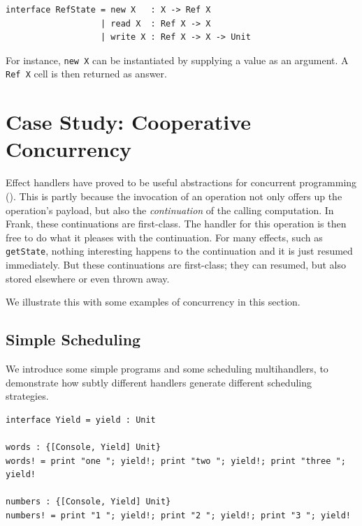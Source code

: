 \documentclass[msc,deptreport,cs]{infthesis} %
\newcommand{\code}[1]{\lstinline{#1}}
\newcommand{\todo}[1]
           {{\par\noindent\small\color{RoyalPurple}
  \framebox{\parbox{\dimexpr\linewidth-2\fboxsep-2\fboxrule}
    {\textbf{TODO:} #1}}}}
\begin{document}
\begin{lstlisting}
interface RefState = new X   : X -> Ref X
                   | read X  : Ref X -> X
                   | write X : Ref X -> X -> Unit
\end{lstlisting}

\noindent For instance, \code{new X} can be instantiated by supplying a value as
an argument. A \code{Ref X} cell is then returned as answer.

\section{Case Study: Cooperative Concurrency}
\label{sec:concurrency}


Effect handlers have proved to be useful abstractions for concurrent programming
(\cite{dolan2015effective, dolan2017concurrent, hillerstrom2016compilation}).
This is partly because the invocation of an operation not only offers up the
operation's payload, but also the \emph{continuation} of the calling
computation. In Frank, these continuations are first-class. The handler for this
operation is then free to do what it pleases with the continuation. For many
effects, such as \code{getState}, nothing interesting happens to the
continuation and it is just resumed immediately. But these continuations are
first-class; they can resumed, but also stored elsewhere or even thrown away.

We illustrate this with some examples of concurrency in this section.

%

\subsection{Simple Scheduling}
\label{subsec:simple-scheduling}

We introduce some simple programs and some scheduling multihandlers, to
demonstrate how subtly different handlers generate different scheduling
strategies.

\begin{lstlisting}
interface Yield = yield : Unit

words : {[Console, Yield] Unit}
words! = print "one "; yield!; print "two "; yield!; print "three "; yield!

numbers : {[Console, Yield] Unit}
numbers! = print "1 "; yield!; print "2 "; yield!; print "3 "; yield!
\end{lstlisting}
\end{document}
